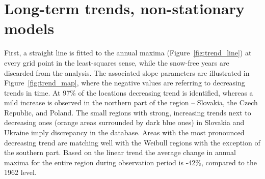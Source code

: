 \section{Long-term trends, non-stationary models}
First, a straight line is fitted to the annual maxima (Figure~\ref{fig:trend_line}) at every grid point in the least-squares sense, while the snow-free years are discarded from the analysis. The associated slope parameters are illustrated in Figure~\ref{fig:trend_map}, where the negative values are referring to decreasing trends in time. At 97\% of the locations decreasing trend is identified, whereas a mild increase is observed in the northern part of the region -- Slovakia, the Czech Republic, and Poland. The small regions with strong, increasing trends next to decreasing ones (orange areas surrounded by dark blue ones) in Slovakia and Ukraine imply discrepancy in the database. Areas with the most pronounced decreasing trend are matching well with the Weibull regions with the exception of the southern part. Based on the linear trend the average change in annual maxima for the entire region during observation period is -42\%, compared to the 1962 level.

